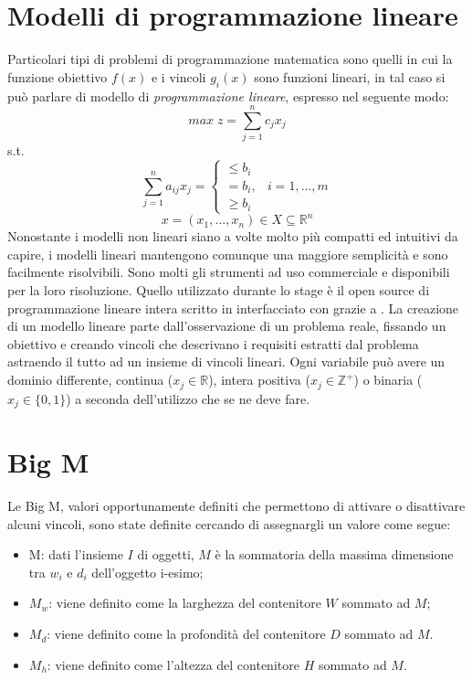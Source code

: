 \section{Modelli di programmazione lineare}
Particolari tipi di problemi di programmazione matematica sono quelli in cui la funzione obiettivo $f(x)$ e i vincoli $g_i(x)$ sono funzioni lineari, in tal caso si può parlare di modello di \textit{programmazione lineare}, espresso nel seguente modo:
$$ max\; z = \sum_{j=1}^n c_j x_j $$
s.t.
$$\sum_{j=1}^n a_{ij} x_j = \begin{cases} \leq b_i \\ = b_i, & i = 1,\dots,m \\ \geq b_i \end{cases}$$
$$x = (x_1,\dots,x_n) \in X \subseteq \mathbb{R}^n$$
Nonostante i modelli non lineari siano a volte molto più compatti ed intuitivi da capire, i modelli lineari mantengono comunque una maggiore semplicità e sono facilmente risolvibili. Sono molti gli strumenti ad uso commerciale e  disponibili per la loro risoluzione. Quello utilizzato durante lo stage è il  open source di programmazione lineare intera  scritto in  interfacciato con  grazie a . La creazione di un modello lineare parte dall'osservazione di un problema reale, fissando un obiettivo e creando vincoli che descrivano i requisiti estratti dal problema astraendo il tutto ad un insieme di vincoli lineari.
Ogni variabile può avere un dominio differente, continua ($x_j \in \mathbb{R}$), intera positiva ($x_j \in \mathbb{Z}^+$) o binaria ($x_j \in \{0,1\}$) a seconda dell'utilizzo che se ne deve fare.
\section{Big M}
Le Big M, valori opportunamente definiti che permettono di attivare o disattivare alcuni vincoli, sono state definite cercando di assegnargli un valore come segue:
\begin{itemize}
	\item M: dati l'insieme $I$ di oggetti, $M$ è la sommatoria della massima dimensione tra $w_i$ e $d_i$ dell'oggetto i-esimo;
	\item $M_w$: viene definito come la larghezza del contenitore $W$ sommato ad $M$;
	\item $M_d$: viene definito come la profondità del contenitore $D$ sommato ad $M$.
	\item $M_h$: viene definito come l'altezza del contenitore $H$ sommato ad $M$.
\end{itemize}

